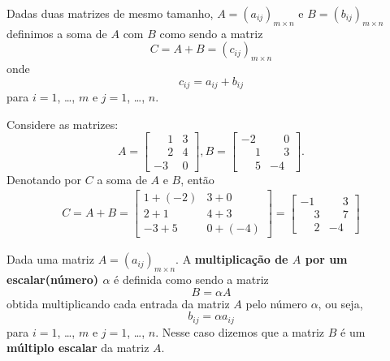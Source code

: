 \documentclass{beamer}
\begin{document}
  \begin{frame}
    \begin{definicao}
      Dadas duas matrizes de mesmo tamanho, $A = (a_{ij})_{m \times n}$ e $B = (b_{ij})_{m \times n}$ definimos a soma de $A$ com $B$ 
      como sendo a matriz
      \[
        C = A + B = (c_{ij})_{m \times n}
      \]
      onde
      \[
        c_{ij} = a_{ij} + b_{ij}
      \]
      para $i = 1$, \dots, $m$ e $j = 1$, \dots, $n$.
    \end{definicao}
  \end{frame}

  \begin{frame}
    \begin{exemplos}
      Considere as matrizes:
      \[
        A = \begin{bmatrix}
          \phantom{-}1 & 3\\
          \phantom{-}2 & 4\\
          -3 & 0
        \end{bmatrix}, 
       B = \begin{bmatrix}
          -2 & \phantom{-}0\\
          \phantom{-}1 & \phantom{-}3\\
          \phantom{-}5 & -4 
        \end{bmatrix}.
    \]
    Denotando por $C$ a soma de $A$ e $B$, então
    \begin{align*}
     C = A + B = \begin{bmatrix}
       1 + (-2) & 3 + 0\\
       2 + 1 & 4 + 3\\
       -3 + 5 & 0 + (-4)
     \end{bmatrix} = \begin{bmatrix}
      -1 & \phantom{-}3\\
      \phantom{-}3 & \phantom{-}7\\
      \phantom{-}2 & -4
     \end{bmatrix} 
    \end{align*}
    \end{exemplos}
  \end{frame}

  \begin{frame}
    \begin{definicao}
      Dada uma matriz $A = (a_{ij})_{m \times n}$. A \textbf{multiplicação de $A$ por um escalar(número) $\alpha$} é definida
      como sendo a matriz
      \[
        B = \alpha A 
      \]
      obtida multiplicando cada entrada da matriz $A$ pelo número $\alpha$, ou seja,
      \[
        b_{ij} = \alpha a_{ij}
      \]
      para $i = 1$, \dots, $m$ e $j = 1$, \dots, $n$. Nesse caso dizemos que a matriz $B$ é um \textbf{múltiplo escalar} da matriz $A$.
    \end{definicao}
  \end{frame}
\end{document}
